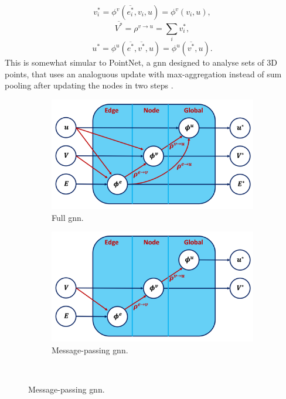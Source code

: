 \[v^*_i = \phi^v(\overline{e^*_i}, v_i, u) = \phi^v(v_i, u),\] 
\[\overline{V^*} = \rho^{v \rightarrow u} = \sum_i v^*_i,\] 
\[u^* = \phi^u(\overline{e^*}, \overline{v^*}, u) = \phi^u( \overline{v^*}, u).\] This is somewhat simular to PointNet, a \gls{gnn} designed to analyse sets of 3D points, that uses an analoguous update with max-aggregation instead of sum pooling after updating the nodes in two steps \cite{pointNet}.  

\begin{figure}[h!]
    \centering
    \begin{subfigure}[b]{0.49\textwidth}
        \centering
        \includegraphics[scale=0.43]{Images/ML/fullGNN.png}
        \caption{Full \gls{gnn}.} 
        \label{fig:diverseGNNfull}
    \end{subfigure}
    \hfill
    \begin{subfigure}[b]{0.49\textwidth}
        \centering
        \includegraphics[scale=0.43]{Images/ML/messagepassingNN.png}
        \caption{Message-passing \gls{gnn}.} 
        \label{fig:pullsFTAGmp}
    \end{subfigure}
    \\  %

\end{figure}
